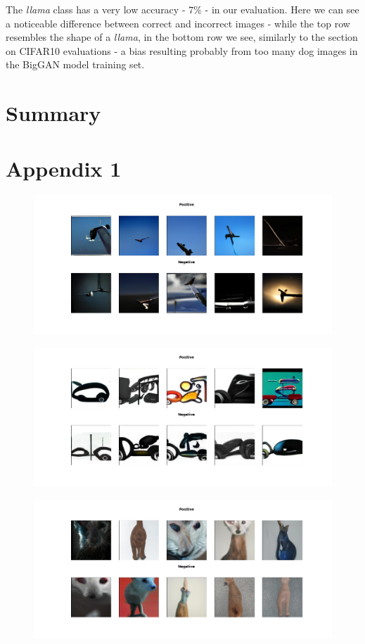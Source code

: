 \documentclass[12pt,a4paper,openany]{book}
\begin{document}
\newline
\noindent The \textit{llama} class has a very low accuracy - $7\%$ - in our evaluation. Here we can see a noticeable difference between correct and incorrect images - while the top row resembles the shape of a \textit{llama}, in the bottom row we see, similarly to the section on CIFAR10 evaluations - a bias resulting probably from too many dog images in the BigGAN model training set.
\chapter{Summary}
\chapter{Appendix 1}
\begin{figure}[h!]
    \centering
    \includegraphics[scale=0.4]{figs/cifar10_examples/airplane.png}
\end{figure}
\begin{figure}[h!]
    \centering
    \includegraphics[scale=0.4]{figs/cifar10_examples/automobile.png}
\end{figure}
\begin{figure}[h!]
    \centering
    \includegraphics[scale=0.4]{figs/cifar10_examples/cat.png}
\end{figure}
\end{document}
